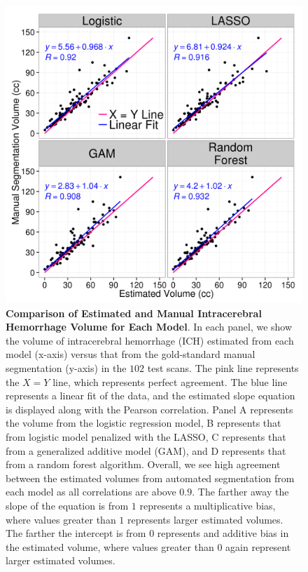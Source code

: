 \documentclass{elsarticle_nonatbib}\usepackage[]{graphicx}\usepackage[]{color}
\begin{document}
\begin{figure}
\centering

\includegraphics[width=\linewidth,keepaspectratio]{Reseg_Volume_Comparison.png}
\caption{{\bf Comparison of Estimated and Manual Intracerebral Hemorrhage Volume for Each Model}.  In each panel, we show the volume of intracerebral hemorrhage (ICH) estimated from each model (x-axis) versus that from the gold-standard manual segmentation (y-axis) in the $102$ test scans.  The pink line represents the $X=Y$ line, which represents perfect agreement.  The blue line represents a linear fit of the data, and the estimated slope equation is displayed along with the Pearson correlation.  Panel A represents the volume from the logistic regression model, B represents that from logistic model penalized with the LASSO, C represents that from a generalized additive model (GAM), and D represents that from a random forest algorithm.  Overall, we see high agreement between the estimated volumes from automated segmentation from each model as all correlations are above $0.9$.  The farther away the slope of the equation is from $1$ represents a multiplicative bias, where values greater than $1$ represents larger estimated volumes.  The farther the intercept is from $0$ represents and additive bias in the estimated volume, where values greater than $0$ again represent larger estimated volumes.  }
\label{fig:vol}
\end{figure}
\end{document}
